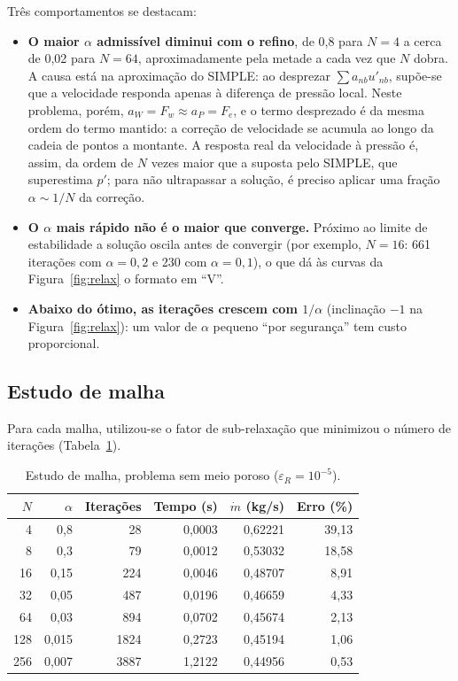 \documentclass[11pt,a4paper]{article}
\begin{document}
Três comportamentos se destacam:
\begin{itemize}
  \item \textbf{O maior $\alpha$ admissível diminui com o refino}, de 0,8
        para $N=4$ a cerca de 0,02 para $N=64$, aproximadamente pela
        metade a cada vez que $N$ dobra. A causa está na aproximação do
        SIMPLE: ao desprezar $\sum a_{nb}u'_{nb}$, supõe-se que a
        velocidade responda apenas à diferença de pressão local. Neste
        problema, porém, $a_W=F_w\approx a_P=F_e$, e o termo desprezado é
        da mesma ordem do termo mantido: a correção de velocidade se acumula
        ao longo da cadeia de pontos a montante. A resposta real da
        velocidade à pressão é, assim, da ordem de $N$ vezes maior que a
        suposta pelo SIMPLE, que superestima $p'$; para não ultrapassar a
        solução, é preciso aplicar uma fração $\alpha\sim1/N$ da correção.
  \item \textbf{O $\alpha$ mais rápido não é o maior que converge.} Próximo
        ao limite de estabilidade a solução oscila antes de convergir
        (por exemplo, $N=16$: 661 iterações com $\alpha=0{,}2$ e 230 com
        $\alpha=0{,}1$), o que dá às curvas da Figura~\ref{fig:relax} o
        formato em ``V''.
  \item \textbf{Abaixo do ótimo, as iterações crescem com $1/\alpha$}
        (inclinação $-1$ na Figura~\ref{fig:relax}): um valor de $\alpha$
        pequeno ``por segurança'' tem custo proporcional.
\end{itemize}

\subsection{Estudo de malha}

Para cada malha, utilizou-se o fator de sub-relaxação que minimizou o
número de iterações (Tabela~\ref{tab:malha}).

\begin{table}[H]
\centering
\caption{Estudo de malha, problema sem meio poroso ($\varepsilon_R=10^{-5}$).}
\label{tab:malha}
\begin{tabular}{rrrrrr}
\hline
$N$ & $\alpha$ & Iterações & Tempo (s) & $\dot m$ (kg/s) & Erro (\%)\\
\hline
4   & 0,8   & 28   & 0,0003 & 0,62221 & 39,13\\
8   & 0,3   & 79   & 0,0012 & 0,53032 & 18,58\\
16  & 0,15  & 224  & 0,0046 & 0,48707 & 8,91\\
32  & 0,05  & 487  & 0,0196 & 0,46659 & 4,33\\
64  & 0,03  & 894  & 0,0702 & 0,45674 & 2,13\\
128 & 0,015 & 1824 & 0,2723 & 0,45194 & 1,06\\
256 & 0,007 & 3887 & 1,2122 & 0,44956 & 0,53\\
\hline
\end{tabular}
\end{table}
\end{document}
